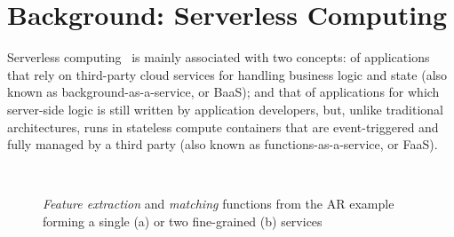 \documentclass[letterpaper, 10 pt, conference]{ieeeconf}  %
\begin{document}
\section{Background: Serverless Computing}\label{sec:background}



Serverless computing~\cite{} is mainly associated with two concepts: of applications that rely on third-party cloud services for handling business logic and state (also known as background-as-a-service, or BaaS); and that of applications for which server-side logic is still written by application developers, but, unlike traditional architectures, runs in stateless compute containers that are event-triggered
and fully managed by a third party (also known as functions-as-a-service, or FaaS).

\begin{figure}[tbp]
	\centering
	\captionsetup[subfigure]{width=0.48\linewidth}
	~
	\captionsetup[subfigure]{width=0.52\linewidth}
	\caption{\textit{Feature extraction} and \textit{matching} functions from the AR example forming a single (a) or two fine-grained (b) services} \label{fig:Mobile_Computation_Offloading}
\end{figure}
\end{document}
